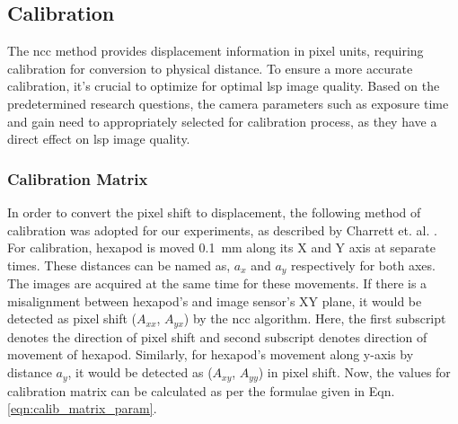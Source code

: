 
\subsection{Calibration}\label{section:calibration}
    The \gls{ncc} method provides displacement information in pixel units, requiring calibration for conversion to physical distance. To ensure a more accurate calibration, it's crucial to optimize for optimal \gls{lsp} image quality. Based on the predetermined research questions, the camera parameters such as exposure time and gain need to appropriately selected for calibration process, as they have a direct effect on \gls{lsp} image quality.

    \subsubsection*{Calibration Matrix}\label{subsection:calib_matrix}
        In order to convert the pixel shift to displacement, the following method of calibration was adopted for our experiments, as described by Charrett et. al. \cite{charrett_2018}. For calibration, hexapod is moved \SI{0.1}{\milli\meter} along its X and Y axis at separate times. These distances can be named as, $a_x$ and $a_y$ respectively for both axes. The images are acquired at the same time for these movements. If there is a misalignment between hexapod's and image sensor's XY plane, it would be detected as pixel shift ($A_{xx}$, $A_{yx}$) by the \gls{ncc} algorithm. Here, the first subscript denotes the direction of pixel shift and second subscript denotes direction of movement of hexapod. Similarly, for hexapod's movement along y-axis by distance $a_y$, it would be detected as ($A_{xy}$, $A_{yy}$) in pixel shift. Now, the values for calibration matrix can be calculated as per the formulae given in Eqn. \ref{eqn:calib_matrix_param}.

